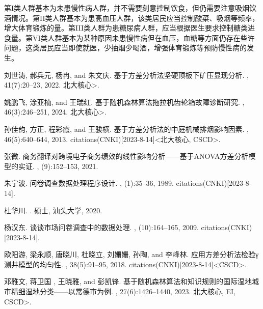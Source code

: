 \documentclass[withoutpreface,bwprint]{cumcmthesis} %
\begin{document}
第I类人群基本为未患慢性病人群，并不需要刻意控制饮食，但仍需要注意吸烟饮酒情况。第II类人群基本为患高血压人群，该类居民应当控制酸菜、吸烟等频率，增大体育锻炼的量。第III类人群为患糖尿病人群，应当根据医生要求控制糖类进食量。第VI类人群基本为某种原因未患慢性病但在血压，血糖等方面仍存在些许问题，这类居民应当即使就医，少抽烟少喝酒，增强体育锻炼等预防慢性病的发生。











\clearpage
\begin{thebibliography}{99}%
刘世涛,  郝兵元,  杨冉, and  朱文庆.
\newblock 基于方差分析法坚硬顶板下矿压显现分析.
, 41(7):20--23, 2022.
\newblock {\textless}北大核心{\textgreater}.

 姚鹏飞,  涂亚楠, and  王瑞红.
\newblock 基于随机森林算法拖拉机齿轮箱故障诊断研究.
, 46(3):246--251, 2024.
\newblock {\textless}北大核心{\textgreater}.

 孙佳韵,  方正,  程彩霞, and  王骏横.
\newblock 基于方差分析法的中庭机械排烟影响因素.
, 46(5):640--644, 2013.
 citations(CNKI)[2023-8-14]{\textless}北大核心,
  CSCD{\textgreater}.

 张微.
\newblock
  商务翻译对跨境电子商务绩效的线性影响分析——基于{ANOVA方差分析模型的实证}.
, (9):152--153, 2021.

 朱宁波.
\newblock 问卷调查数据处理程序设计.
, (1):35--36, 1989.
 citations(CNKI)[2023-8-14].

 杜华川.
.
\newblock 硕士, 汕头大学, 2020.

 杨汉东.
\newblock 谈谈市场问卷调查中的数据处理.
, (10):164--165, 2009.
 citations(CNKI)[2023-8-14].

 欧阳游,  梁永顺,  唐晓川,  杜晓立,  刘姗姗,  孙陶, and 
  李峰林.
\newblock 应用方差分析法检验γ测井模型的均匀性.
, 38(5):91--95, 2018.
 citations(CNKI)[2023-8-14]{\textless}CSCD{\textgreater}.

 邓雅文, 蒋卫国 ,  王晓雅, and  彭凯锋.
\newblock
  基于随机森林算法和知识规则的国际湿地城市精细湿地分类——以常德市为例.
, 27(6):1426--1440, 2023.
\newblock {\textless}北大核心, EI, CSCD{\textgreater}.
\end{thebibliography}
\end{document}
